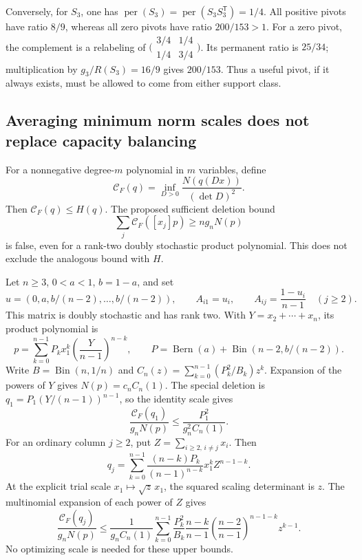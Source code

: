 \documentclass[11pt,a4paper]{article}
\theoremstyle{definition}
\theoremstyle{remark}
\newcommand{\per}{\operatorname{per}}
\newcommand{\T}{\mathsf{T}}
\begin{document}
Conversely, for $S_3$, one has
$\per(S_3)=\per(S_3S_3^\T)=1/4$.
All positive pivots have ratio $8/9$, whereas all zero pivots have ratio
$200/153>1$.
For a zero pivot, the complement is a relabeling of
$\bigl(\begin{smallmatrix}3/4&1/4\\1/4&3/4\end{smallmatrix}\bigr)$.
Its permanent ratio is $25/34$; multiplication by $g_3/R(S_3)=16/9$
gives $200/153$.
Thus a useful pivot, if it always exists, must be allowed to come from
either support class.

\subsection{Averaging minimum norm scales does not replace capacity balancing}

For a nonnegative degree-$m$ polynomial in $m$ variables, define
\[
 \mathcal C_F(q)=\inf_{D>0}\frac{N(q(Dx))}{(\det D)^2}.
\]
Then $\mathcal C_F(q)\le H(q)$.
The proposed sufficient deletion bound
\begin{equation}\label{eq:obs-fock-false}
 \sum_j\mathcal C_F([x_j]p)\ge ng_nN(p)
\end{equation}
is false, even for a rank-two doubly stochastic product polynomial.
This does not exclude the analogous bound with $H$.

Let $n\ge3$, $0<a<1$, $b=1-a$, and set
\[
 u=(0,a,b/(n-2),\ldots,b/(n-2)),\qquad
 A_{i1}=u_i,\qquad A_{ij}=\frac{1-u_i}{n-1}\quad(j\ge2).
\]
This matrix is doubly stochastic and has rank two.
With $Y=x_2+\cdots+x_n$, its product polynomial is
\[
 p=\sum_{k=0}^{n-1}P_k x_1^k\left(\frac{Y}{n-1}\right)^{n-k},\qquad
 P=\operatorname{Bern}(a)+\operatorname{Bin}(n-2,b/(n-2)).
\]
Write $B=\operatorname{Bin}(n,1/n)$ and
$C_n(z)=\sum_{k=0}^{n-1}(P_k^2/B_k)z^k$.
Expansion of the powers of $Y$ gives $N(p)=c_nC_n(1)$.
The special deletion is
$q_1=P_1(Y/(n-1))^{n-1}$, so the identity scale gives
\begin{equation}\label{eq:obs-special-trial}
 \frac{\mathcal C_F(q_1)}{g_nN(p)}
 \le\frac{P_1^2}{g_n^2C_n(1)}.
\end{equation}
For an ordinary column $j\ge2$, put
$Z=\sum_{i\ge2,\,i\ne j}x_i$. Then
\[
 q_j=\sum_{k=0}^{n-1}\frac{(n-k)P_k}{(n-1)^{n-k}}x_1^kZ^{n-1-k}.
\]
At the explicit trial scale $x_1\mapsto\sqrt z\,x_1$, the squared
scaling determinant is $z$.
The multinomial expansion of each power of $Z$ gives
\begin{equation}\label{eq:obs-ordinary-trial}
 \frac{\mathcal C_F(q_j)}{g_nN(p)}
 \le\frac1{g_nC_n(1)}\sum_{k=0}^{n-1}\frac{P_k^2}{B_k}
 \frac{n-k}{n-1}\left(\frac{n-2}{n-1}\right)^{n-1-k}z^{k-1}.
\end{equation}
No optimizing scale is needed for these upper bounds.
\end{document}
